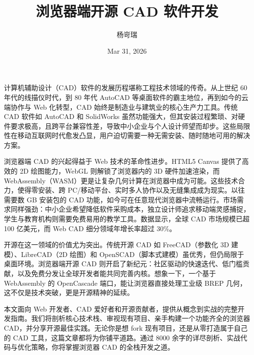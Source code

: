 \title{浏览器端开源 CAD 软件开发}
\author{杨岢瑞}
\date{Mar 31, 2026}
\maketitle
计算机辅助设计（CAD）软件的发展历程堪称工程技术领域的传奇。从上世纪 60 年代的线描仪时代，到 80 年代 AutoCAD 等桌面软件的霸主地位，再到如今的云端协作与 Web 化转型，CAD 始终是制造业与建筑业的核心生产力工具。传统 CAD 软件如 AutoCAD 和 SolidWorks 虽然功能强大，但其安装过程繁琐、对硬件要求极高，且跨平台兼容性差，导致中小企业与个人设计师望而却步。这些局限性在移动互联网时代愈发凸显，用户迫切需要一种无需安装、随时随地可用的解决方案。\par
浏览器端 CAD 的兴起得益于 Web 技术的革命性进步。HTML5 Canvas 提供了高效的 2D 绘图能力，WebGL 则解锁了浏览器内的 3D 硬件加速渲染，而 WebAssembly（WASM）更是让复杂几何计算在浏览器中成为可能。这些技术合力，使得零安装、跨 PC/移动平台、实时多人协作以及无缝集成成为现实。以往需要数 GB 安装包的 CAD 功能，如今可在任意现代浏览器中流畅运行。市场需求同样强劲：中小企业希望降低软件采购成本，独立设计师追求移动端灵感捕捉，学生与教育机构则需要免费易用的教学工具。数据显示，全球 CAD 市场规模已超 100 亿美元，而 Web CAD 细分领域年增长率超过 30\%{}。\par
开源在这一领域的价值尤为突出。传统开源 CAD 如 FreeCAD（参数化 3D 建模）、LibreCAD（2D 绘图）和 OpenSCAD（脚本式建模）虽优秀，但仍局限于桌面环境。浏览器端开源 CAD 则开启了新纪元：社区驱动的快速迭代、低门槛贡献，以及免费分发让全球开发者能共同完善内核。想象一下，一个基于 WebAssembly 的 OpenCascade 端口，能让浏览器直接处理工业级 BREP 几何，这不仅是技术突破，更是开源精神的延续。\par
本文面向 Web 开发者、CAD 爱好者和开源贡献者，提供从概念到实战的完整开发指南。我们将剖析核心技术栈、审视现有项目、亲手构建一个功能齐全的浏览器 CAD，并分享开源最佳实践。无论你是想 fork 现有项目，还是从零打造属于自己的 CAD 工具，这篇文章都将为你铺平道路。通过 8000 余字的详尽剖析、实战代码与优化策略，你将掌握浏览器 CAD 的全栈开发之道。\par
